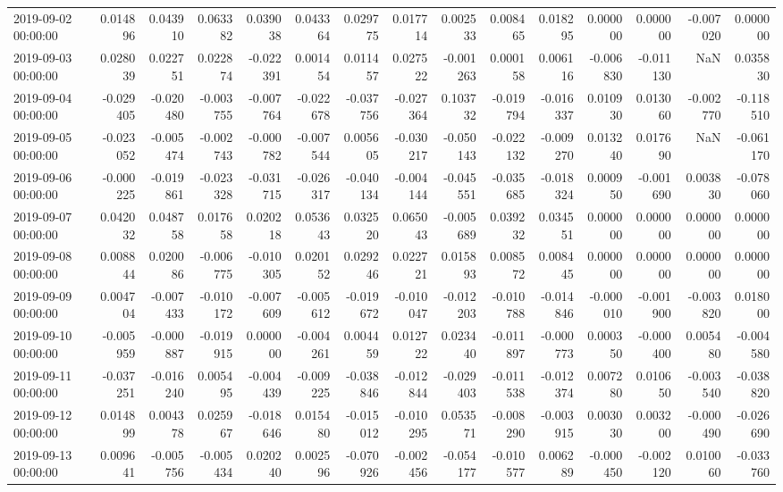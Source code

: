 \begin{tabular}{lrrrrrrrrrrrrrr}
2019-09-02 00:00:00 & 0.014896 & 0.043910 & 0.063382 & 0.039038 & 0.043364 & 0.029775 & 0.017714 & 0.002533 & 0.008465 & 0.018295 & 0.000000 & 0.000000 & -0.007020 & 0.000000 \\
2019-09-03 00:00:00 & 0.028039 & 0.022751 & 0.022874 & -0.022391 & 0.001454 & 0.011457 & 0.027522 & -0.001263 & 0.000158 & 0.006116 & -0.006830 & -0.011130 & NaN & 0.035830 \\
2019-09-04 00:00:00 & -0.029405 & -0.020480 & -0.003755 & -0.007764 & -0.022678 & -0.037756 & -0.027364 & 0.103732 & -0.019794 & -0.016337 & 0.010930 & 0.013060 & -0.002770 & -0.118510 \\
2019-09-05 00:00:00 & -0.023052 & -0.005474 & -0.002743 & -0.000782 & -0.007544 & 0.005605 & -0.030217 & -0.050143 & -0.022132 & -0.009270 & 0.013240 & 0.017690 & NaN & -0.061170 \\
2019-09-06 00:00:00 & -0.000225 & -0.019861 & -0.023328 & -0.031715 & -0.026317 & -0.040134 & -0.004144 & -0.045551 & -0.035685 & -0.018324 & 0.000950 & -0.001690 & 0.003830 & -0.078060 \\
2019-09-07 00:00:00 & 0.042032 & 0.048758 & 0.017658 & 0.020218 & 0.053643 & 0.032520 & 0.065043 & -0.005689 & 0.039232 & 0.034551 & 0.000000 & 0.000000 & 0.000000 & 0.000000 \\
2019-09-08 00:00:00 & 0.008844 & 0.020086 & -0.006775 & -0.010305 & 0.020152 & 0.029246 & 0.022721 & 0.015893 & 0.008572 & 0.008445 & 0.000000 & 0.000000 & 0.000000 & 0.000000 \\
2019-09-09 00:00:00 & 0.004704 & -0.007433 & -0.010172 & -0.007609 & -0.005612 & -0.019672 & -0.010047 & -0.012203 & -0.010788 & -0.014846 & -0.000010 & -0.001900 & -0.003820 & 0.018000 \\
2019-09-10 00:00:00 & -0.005959 & -0.000887 & -0.019915 & 0.000000 & -0.004261 & 0.004459 & 0.012722 & 0.023440 & -0.011897 & -0.000773 & 0.000350 & -0.000400 & 0.005480 & -0.004580 \\
2019-09-11 00:00:00 & -0.037251 & -0.016240 & 0.005495 & -0.004439 & -0.009225 & -0.038846 & -0.012844 & -0.029403 & -0.011538 & -0.012374 & 0.007280 & 0.010650 & -0.003540 & -0.038820 \\
2019-09-12 00:00:00 & 0.014899 & 0.004378 & 0.025967 & -0.018646 & 0.015480 & -0.015012 & -0.010295 & 0.053571 & -0.008290 & -0.003915 & 0.003030 & 0.003200 & -0.000490 & -0.026690 \\
2019-09-13 00:00:00 & 0.009641 & -0.005756 & -0.005434 & 0.020240 & 0.002596 & -0.070926 & -0.002456 & -0.054177 & -0.010577 & 0.006289 & -0.000450 & -0.002120 & 0.010060 & -0.033760 \\

\end{tabular}
